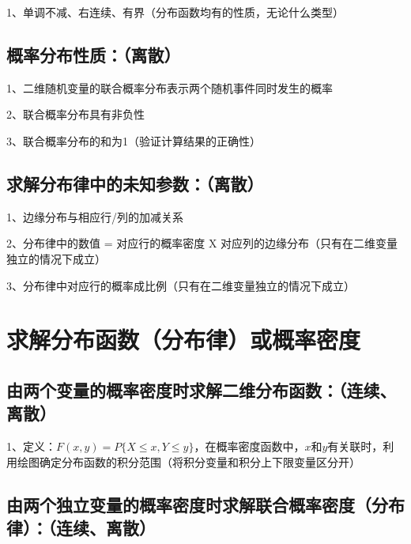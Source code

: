 1、单调不减、右连续、有界（分布函数均有的性质，无论什么类型）



\subsection{概率分布性质：（离散）}

1、二维随机变量的联合概率分布表示两个随机事件同时发生的概率

2、联合概率分布具有非负性

3、联合概率分布的和为1（验证计算结果的正确性）



\subsection{求解分布律中的未知参数：（离散）}

1、边缘分布与相应行/列的加减关系

2、分布律中的数值 = 对应行的概率密度 X 对应列的边缘分布（只有在二维变量独立的情况下成立）

3、分布律中对应行的概率成比例（只有在二维变量独立的情况下成立）

\section{求解分布函数（分布律）或概率密度}



\subsection{由两个变量的概率密度时求解二维分布函数：（连续、离散）}

1、定义：$ F(x,y)=P\{ X \le x, Y \le y \} $，在概率密度函数中，$ x $和$ y $有关联时，利用绘图确定分布函数的积分范围（将积分变量和积分上下限变量区分开）



\subsection{由两个独立变量的概率密度时求解联合概率密度（分布律）：（连续、离散）}


